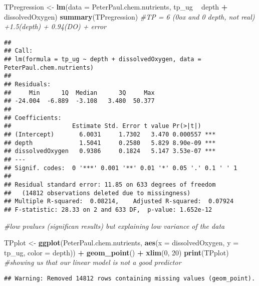 \documentclass[]{article}
\newenvironment{Shaded}{\begin{snugshade}}{\end{snugshade}}
\newcommand{\KeywordTok}[1]{\textcolor[rgb]{0.13,0.29,0.53}{\textbf{#1}}}
\newcommand{\DataTypeTok}[1]{\textcolor[rgb]{0.13,0.29,0.53}{#1}}
\newcommand{\DecValTok}[1]{\textcolor[rgb]{0.00,0.00,0.81}{#1}}
\newcommand{\StringTok}[1]{\textcolor[rgb]{0.31,0.60,0.02}{#1}}
\newcommand{\CommentTok}[1]{\textcolor[rgb]{0.56,0.35,0.01}{\textit{#1}}}
\newcommand{\OperatorTok}[1]{\textcolor[rgb]{0.81,0.36,0.00}{\textbf{#1}}}
\newcommand{\NormalTok}[1]{#1}
\begin{document}
\begin{Shaded}
\begin{Highlighting}[]
\NormalTok{TPregression <-}\StringTok{ }\KeywordTok{lm}\NormalTok{(}\DataTypeTok{data =}\NormalTok{ PeterPaul.chem.nutrients, tp_ug }\OperatorTok{~}\StringTok{ }\NormalTok{depth }\OperatorTok{+}\StringTok{ }\NormalTok{dissolvedOxygen)}
\KeywordTok{summary}\NormalTok{(TPregression) }\CommentTok{#TP = 6 (0ox and 0 depth, not real) +1.5(depth) + 0.94(DO) + error}
\end{Highlighting}
\end{Shaded}

\begin{verbatim}
## 
## Call:
## lm(formula = tp_ug ~ depth + dissolvedOxygen, data = PeterPaul.chem.nutrients)
## 
## Residuals:
##     Min      1Q  Median      3Q     Max 
## -24.004  -6.889  -3.108   3.480  50.377 
## 
## Coefficients:
##                 Estimate Std. Error t value Pr(>|t|)    
## (Intercept)       6.0031     1.7302   3.470 0.000557 ***
## depth             1.5041     0.2580   5.829 8.90e-09 ***
## dissolvedOxygen   0.9386     0.1824   5.147 3.53e-07 ***
## ---
## Signif. codes:  0 '***' 0.001 '**' 0.01 '*' 0.05 '.' 0.1 ' ' 1
## 
## Residual standard error: 11.85 on 633 degrees of freedom
##   (14812 observations deleted due to missingness)
## Multiple R-squared:  0.08214,    Adjusted R-squared:  0.07924 
## F-statistic: 28.33 on 2 and 633 DF,  p-value: 1.652e-12
\end{verbatim}

\begin{Shaded}
\begin{Highlighting}[]
\CommentTok{#low pvalues (significan results) but explaining low variance of the data }

\NormalTok{TPplot <-}\StringTok{ }\KeywordTok{ggplot}\NormalTok{(PeterPaul.chem.nutrients, }
                 \KeywordTok{aes}\NormalTok{(}\DataTypeTok{x =}\NormalTok{ dissolvedOxygen, }\DataTypeTok{y =}\NormalTok{ tp_ug, }\DataTypeTok{color =}\NormalTok{ depth)) }\OperatorTok{+}
\StringTok{  }\KeywordTok{geom_point}\NormalTok{() }\OperatorTok{+}
\StringTok{  }\KeywordTok{xlim}\NormalTok{(}\DecValTok{0}\NormalTok{, }\DecValTok{20}\NormalTok{)}
\KeywordTok{print}\NormalTok{(TPplot) }\CommentTok{#showing us that our linear model is not a good predictor}
\end{Highlighting}
\end{Shaded}

\begin{verbatim}
## Warning: Removed 14812 rows containing missing values (geom_point).
\end{verbatim}
\end{document}
